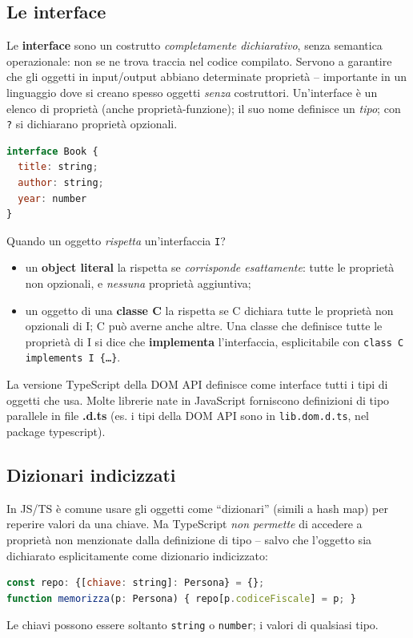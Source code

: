\subsection{Le interface}
\begin{definizione}[Interface]
Le \textbf{interface} sono un costrutto \emph{completamente dichiarativo}, senza semantica
operazionale: non se ne trova traccia nel codice compilato. Servono a garantire che gli
oggetti in input/output abbiano determinate propriet\`a -- importante in un linguaggio dove si
creano spesso oggetti \emph{senza} costruttori. Un'interface \`e un elenco di propriet\`a
(anche propriet\`a-funzione); il suo nome definisce un \emph{tipo}; con \texttt{?} si
dichiarano propriet\`a opzionali.
\begin{lstlisting}[language=JavaScript]
interface Book {
  title: string;
  author: string;
  year: number
}
\end{lstlisting}
\end{definizione}

Quando un oggetto \emph{rispetta} un'interfaccia \texttt{I}?
\begin{itemize}
  \item un \textbf{object literal} la rispetta se \emph{corrisponde esattamente}: tutte le
        propriet\`a non opzionali, e \emph{nessuna} propriet\`a aggiuntiva;
  \item un oggetto di una \textbf{classe C} la rispetta se C dichiara tutte le propriet\`a
        non opzionali di I; C pu\`o averne anche altre. Una classe che definisce tutte le
        propriet\`a di I si dice che \textbf{implementa} l'interfaccia, esplicitabile con
        \texttt{class C implements I \{\dots\}}.
\end{itemize}
La versione TypeScript della DOM API definisce come interface tutti i tipi di oggetti che
usa. Molte librerie nate in JavaScript forniscono definizioni di tipo parallele in file
\textbf{.d.ts} (es. i tipi della DOM API sono in \texttt{lib.dom.d.ts}, nel package
typescript).

\subsection{Dizionari indicizzati}
In JS/TS \`e comune usare gli oggetti come ``dizionari'' (simili a hash map) per reperire
valori da una chiave. Ma TypeScript \emph{non permette} di accedere a propriet\`a non
menzionate dalla definizione di tipo -- salvo che l'oggetto sia dichiarato esplicitamente
come dizionario indicizzato:
\begin{lstlisting}[language=JavaScript]
const repo: {[chiave: string]: Persona} = {};
function memorizza(p: Persona) { repo[p.codiceFiscale] = p; }
\end{lstlisting}
Le chiavi possono essere soltanto \texttt{string} o \texttt{number}; i valori di qualsiasi
tipo.

